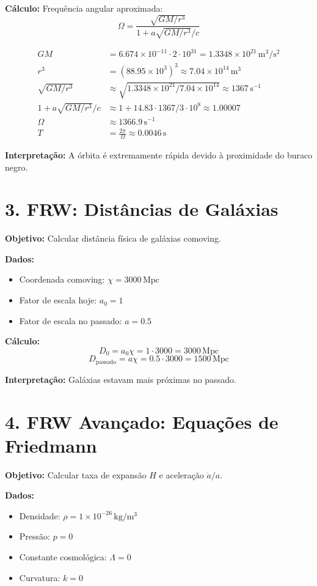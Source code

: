 \documentclass[12pt]{article}
\begin{document}
\textbf{Cálculo:}  
Frequência angular aproximada:  
\[
\Omega = \frac{\sqrt{GM/r^3}}{1 + a \sqrt{GM/r^3}/c}
\]

\begin{align*}
GM &= 6.674 \times 10^{-11} \cdot 2 \cdot 10^{31} = 1.3348 \times 10^{21}\,\mathrm{m^3/s^2} \\
r^3 &= (88.95 \times 10^3)^3 \approx 7.04 \times 10^{14}\,\mathrm{m^3} \\
\sqrt{GM/r^3} &\approx \sqrt{1.3348 \times 10^{21}/7.04 \times 10^{14}} \approx 1367\,\mathrm{s^{-1}} \\
1 + a \sqrt{GM/r^3}/c &\approx 1 + 14.83 \cdot 1367 / 3 \cdot 10^8 \approx 1.00007 \\
\Omega &\approx 1366.9\,\mathrm{s^{-1}} \\
T &= \frac{2\pi}{\Omega} \approx 0.0046\,\mathrm{s}
\end{align*}

\textbf{Interpretação:} A órbita é extremamente rápida devido à proximidade do buraco negro.

\section*{3. FRW: Distâncias de Galáxias}

\textbf{Objetivo:} Calcular distância física de galáxias comoving.

\textbf{Dados:} 
\begin{itemize}
    \item Coordenada comoving: \(\chi = 3000\,\mathrm{Mpc}\)
    \item Fator de escala hoje: \(a_0 = 1\)
    \item Fator de escala no passado: \(a = 0.5\)
\end{itemize}

\textbf{Cálculo:}  
\[
D_0 = a_0 \chi = 1 \cdot 3000 = 3000\,\mathrm{Mpc}
\]  
\[
D_\mathrm{passado} = a \chi = 0.5 \cdot 3000 = 1500\,\mathrm{Mpc}
\]

\textbf{Interpretação:} Galáxias estavam mais próximas no passado.

\section*{4. FRW Avançado: Equações de Friedmann}

\textbf{Objetivo:} Calcular taxa de expansão \(H\) e aceleração \(\ddot a / a\).

\textbf{Dados:} 
\begin{itemize}
    \item Densidade: \(\rho = 1 \times 10^{-26}\,\mathrm{kg/m^3}\)
    \item Pressão: \(p = 0\)
    \item Constante cosmológica: \(\Lambda = 0\)
    \item Curvatura: \(k = 0\)
\end{itemize}
\end{document}
